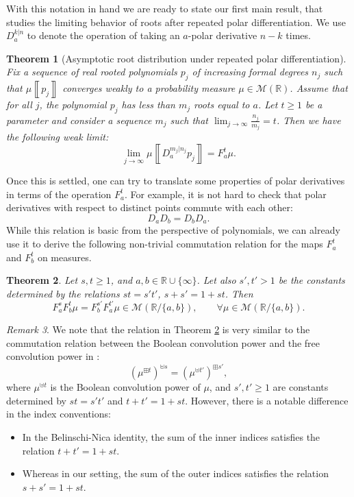 \documentclass[reqno,11pt]{amsart}
\newtheorem{theorem}{Theorem}[section]
\theoremstyle{remark}
\newtheorem{remark}[theorem]{Remark}
\newcommand{\rr}{\mathbb{R}}
\newcommand{\MM}{\mathcal{M}}
\newcommand{\polar}[1]{D_{#1}}
\newcommand{\polars}[3]{D_{#1}^{#2|#3}}
\newcommand{\pfreepower}[2]{F_{#1}^{#2}}
\newcommand{\meas}[1]{\mu \left\llbracket #1 \right\rrbracket}
\begin{document}
With this notation in hand we are ready to state our first main result, that studies the limiting behavior of roots after repeated polar differentiation.
We use $\polars{a}{k}{n}$ to denote the operation of taking an $a$-polar derivative $n-k$ times.

\begin{theorem}[Asymptotic root distribution under repeated polar differentiation]
\label{thm:asymptotic.polar.diff.intro}
Fix a sequence of real rooted polynomials $p_j$ of increasing formal degrees $n_j$ such that $\meas{p_j}$ converges weakly to a probability measure $\mu \in \MM({\rr})$. Assume that for all $j$, the polynomial $p_j$ has less than $ m_j $ roots equal to $a$. Let $t\geq 1$ be a parameter and consider a sequence $m_j$ such that $\lim_{j\to\infty}\frac{n_j}{m_j}=t$. Then
we have the following weak limit:
$$\lim_{j\to\infty} \meas{\polars{a}{m_j}{n_j} p_j}=  \pfreepower{a}{t}\mu.$$
\end{theorem}



Once this is settled, one can try to translate some properties of polar derivatives in terms of the operation $ \pfreepower{a}{t}$. For example, it is not hard to check that polar derivatives with respect to distinct points commute with each other:
$$\polar{a}\polar{b}=\polar{b}\polar{a}.$$
While this relation is basic from the perspective of polynomials, we can already use it to derive the following non-trivial commutation relation for the maps $\pfreepower{a}{t}$ and $\pfreepower{b}{t}$ on measures.

\begin{theorem}\label{thm:commutation.intro}
Let $ s,t\geq 1$, and $a,b\in \rr\cup \{\infty\}$. Let also $s',t' >1$ be the constants determined by the relations $ st=s't' $, $ s+s' = 1+st $. Then 
$$ \pfreepower{a}{s}\pfreepower{b}{t} \mu =\pfreepower{b}{s'}\pfreepower{a}{t'}\mu \in \MM(\rr/\{a,b\}), \qquad \forall \mu \in \MM(\rr/\{a,b\}). $$
\end{theorem}


\begin{remark}
    We note that the relation in Theorem \ref{thm:commutation.intro} is very similar to the commutation relation between the Boolean convolution power and the free convolution power in \cite{belinschi2008remarkable}:
    $$ \left(\mu^{\boxplus t}\right)^{\uplus s } = \left(\mu^{\uplus t'}\right)^{\boxplus s' }, $$
    where $ \mu^{\uplus t} $ is the Boolean convolution power of $\mu$, and $s',t'\geq 1$ are constants determined by $ st=s't' $ and $t+t'=1+st$. However, there is a notable difference in the index conventions:
    \begin{itemize}
    \item In the Belinschi-Nica identity, the sum of the inner indices satisfies the relation $t+t'=1+st $.
    \item Whereas in our setting, the sum of the outer indices satisfies the relation $ s+s'=1+st $.    
    \end{itemize}
\end{remark}
\end{document}
